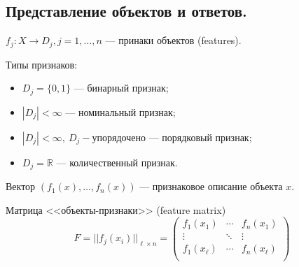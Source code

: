 \documentclass{beamer}
\begin{document}
\subsection{Представление объектов и ответов.}
\begin{frame}
$f_j: X \rightarrow D_j, j=1,\dots,n$ --- принаки объектов (features).

Типы признаков:
\begin{itemize}
    \item $D_j = \{0, 1\}$ --- бинарный признак;
    \item $|D_j| < \infty$ --- номинальный признак;
    \item $|D_j| < \infty, ~ D_j - \text{упорядочено}$ --- порядковый признак;
    \item $D_j = \mathbb{R}$ --- количественный признак.
\end{itemize}

Вектор $\left(f_1(x),\dots,f_n(x)\right)$ --- признаковое описание объекта $x$.

Матрица <<объекты-признаки>> (feature matrix)
$$
F = ||f_j(x_i)||_{\ell \times n} = \begin{pmatrix}
    f_1(x_1) & \cdots & f_n(x_1) \\
    \vdots   & \ddots &   \vdots \\
    f_1(x_\ell) & \cdots & f_n(x_\ell) \\
    \end{pmatrix}
$$
\end{frame}
\end{document}
